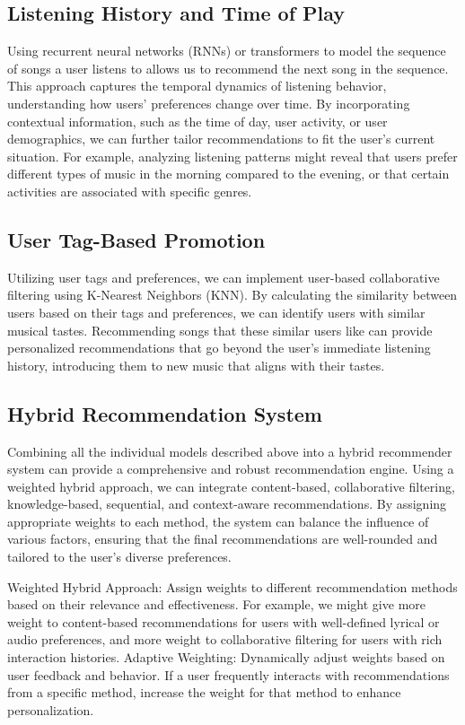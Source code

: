 \documentclass[9pt,twocolumn,twoside,lineno]{gsajnl}
\begin{document}
\subsection{Listening History and Time of Play}
Using recurrent neural networks (RNNs) or transformers to model the sequence of songs a user listens to allows us to recommend the next song in the sequence. This approach captures the temporal dynamics of listening behavior, understanding how users’ preferences change over time. By incorporating contextual information, such as the time of day, user activity, or user demographics, we can further tailor recommendations to fit the user’s current situation. For example, analyzing listening patterns might reveal that users prefer different types of music in the morning compared to the evening, or that certain activities are associated with specific genres.

\subsection{User Tag-Based Promotion}
Utilizing user tags and preferences, we can implement user-based collaborative filtering using K-Nearest Neighbors (KNN). By calculating the similarity between users based on their tags and preferences, we can identify users with similar musical tastes. Recommending songs that these similar users like can provide personalized recommendations that go beyond the user’s immediate listening history, introducing them to new music that aligns with their tastes.

\subsection{Hybrid Recommendation System}
Combining all the individual models described above into a hybrid recommender system can provide a comprehensive and robust recommendation engine. Using a weighted hybrid approach, we can integrate content-based, collaborative filtering, knowledge-based, sequential, and context-aware recommendations. By assigning appropriate weights to each method, the system can balance the influence of various factors, ensuring that the final recommendations are well-rounded and tailored to the user’s diverse preferences.

Weighted Hybrid Approach: Assign weights to different recommendation methods based on their relevance and effectiveness. For example, we might give more weight to content-based recommendations for users with well-defined lyrical or audio preferences, and more weight to collaborative filtering for users with rich interaction histories.
Adaptive Weighting: Dynamically adjust weights based on user feedback and behavior. If a user frequently interacts with recommendations from a specific method, increase the weight for that method to enhance personalization.
\end{document}
